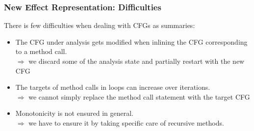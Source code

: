 \documentclass[hyperref={pdfpagelabels=false}]{beamer}
\begin{document}
%
%
%
%


\begin{frame}[fragile]
\frametitle{New Effect Representation: Difficulties}
    There is few difficulties when dealing with CFGs as summaries:
    \begin{itemize}
        \item The CFG under analysis gets modified when inlining the CFG
        corresponding to a method call.\\
            $\Rightarrow$ we discard some of the analysis state and partially restart with the new CFG

        \item The targets of method calls in loops can increase over iterations.\\
            $\Rightarrow$ we cannot simply replace the method call statement with the target CFG

        \item Monotonicity is not ensured in general.\\
            $\Rightarrow$ we have to ensure it by taking specific care of
            recursive methods.
    \end{itemize}
\end{frame}
\end{document}
